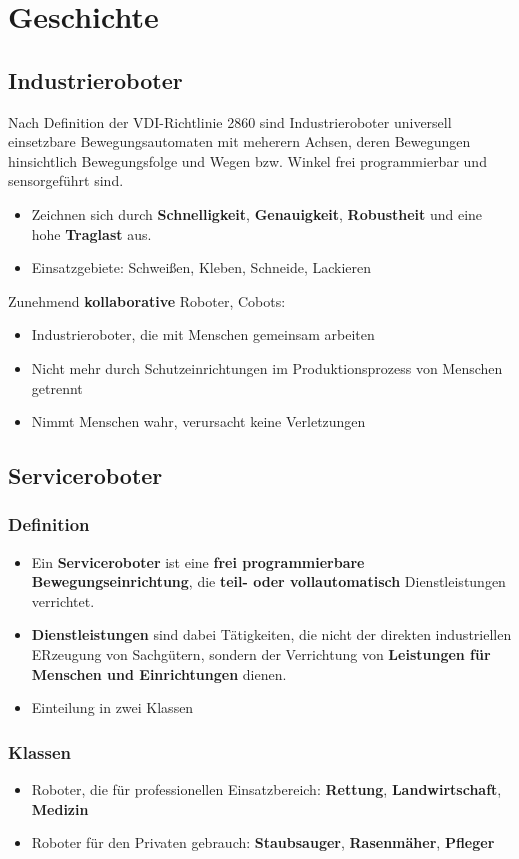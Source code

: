 \chapter{Geschichte}
\section{Industrieroboter}
Nach Definition der VDI-Richtlinie 2860 sind Industrieroboter universell einsetzbare Bewegungsautomaten mit meherern Achsen, deren Bewegungen hinsichtlich Bewegungsfolge und Wegen bzw. Winkel frei programmierbar und sensorgeführt sind.
\begin{itemize}
	\item Zeichnen sich durch \textbf{Schnelligkeit}, \textbf{Genauigkeit}, \textbf{Robustheit }und eine hohe \textbf{Traglast }aus.
	\item Einsatzgebiete: Schweißen, Kleben, Schneide, Lackieren
\end{itemize}
Zunehmend \textbf{kollaborative} Roboter, Cobots:
\begin{itemize}
	\item Industrieroboter, die mit Menschen gemeinsam arbeiten
	\item Nicht mehr durch Schutzeinrichtungen im Produktionsprozess von Menschen getrennt
	\item Nimmt Menschen wahr, verursacht keine Verletzungen
\end{itemize}

\section{Serviceroboter}
\subsection{Definition}
\begin{itemize}
	\item Ein \textbf{Serviceroboter} ist eine \textbf{frei programmierbare Bewegungseinrichtung}, die \textbf{teil- oder vollautomatisch} Dienstleistungen verrichtet.
	\item \textbf{Dienstleistungen} sind dabei Tätigkeiten, die nicht der direkten industriellen ERzeugung von Sachgütern, sondern der Verrichtung von \textbf{Leistungen für Menschen und Einrichtungen} dienen.
	\item Einteilung in zwei Klassen
	
\end{itemize}
\subsection{Klassen}
\begin{itemize}
	\item Roboter, die für professionellen Einsatzbereich: \textbf{Rettung}, \textbf{Landwirtschaft}, \textbf{Medizin}
	\item Roboter für den Privaten gebrauch: \textbf{Staubsauger}, \textbf{Rasenmäher}, \textbf{Pfleger}
\end{itemize}